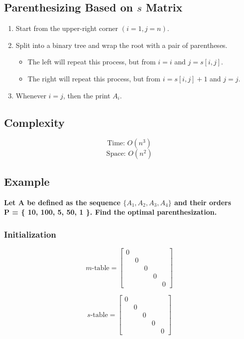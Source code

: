 \subsection*{Parenthesizing Based on $s$ Matrix}
\begin{enumerate}
	\item Start from the upper-right corner $(i = 1, j = n)$.
	\item Split into a binary tree and wrap the root with a pair of parentheses.
	\begin{itemize}
		\item The left will repeat this process, but from $i = i$ and $j = s[i,j]$.
		\item The right will repeat this process, but from $i= s[i,j] + 1$ and $j = j$.
	\end{itemize}
	\item Whenever $i = j$, then the print $A_i$.
\end{enumerate}
\subsection*{Complexity}
$$
\text{Time: } O(n^3)
$$
$$
\text{Space: } O(n^2)
$$

\subsection{Example}
\textbf{Let A be defined as the sequence $\{ A_1, A_2, A_3, A_4 \}$ and their orders\\ P = \{ 10, 100, 5, 50, 1  \}. Find the optimal parenthesization.}

\subsubsection*{Initialization}
\begin{minipage}{0.5\linewidth}
	$$
	m\text{-table}=
	\begin{bmatrix}
	0	&		&		&		&		\\
	&	0	&		&		&		\\
	&		&	0	&		&			\\			
	&		&		&	0	&		\\
	&		&		&		&	0	
	\end{bmatrix}
	$$
\end{minipage}
\begin{minipage}{0.5\linewidth}
$$
s\text{-table}=
\begin{bmatrix}
0	&		&		&		&		\\
&	0	&		&		&		\\
&		&	0	&		&			\\			
&		&		&	0	&		\\
&		&		&		&	0	
\end{bmatrix}
$$
\end{minipage}
